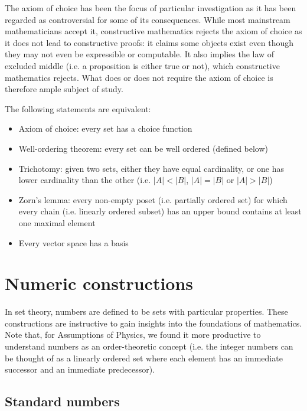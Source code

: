 \documentclass{bareminimum}
\begin{document}
The axiom of choice has been the focus of particular investigation as it has been regarded as controversial for some of its consequences. While most mainstream mathematicians accept it, constructive mathematics rejects the axiom of choice as it does not lead to constructive proofs: it claims some objects exist even though they may not even be expressible or computable. It also implies the law of excluded middle (i.e. a proposition is either true or not), which constructive mathematics rejects. What does or does not require the axiom of choice is therefore ample subject of study.

\begin{prop}
	The following statements are equivalent:
	\begin{itemize}
		\item Axiom of choice: every set has a choice function
		\item Well-ordering theorem: every set can be well ordered (defined below)
		\item Trichotomy: given two sets, either they have equal cardinality, or one has lower cardinality than the other (i.e. $|A| < |B|$, $|A| = |B|$ or $|A| > |B|$)
		\item Zorn's lemma: every non-empty poset (i.e. partially ordered set) for which every chain (i.e. linearly ordered subset) has an upper bound contains at least one maximal element
		\item Every vector space has a basis
	\end{itemize}
\end{prop}

\section{Numeric constructions}
In set theory, numbers are defined to be sets with particular properties. These constructions are instructive to gain insights into the foundations of mathematics. Note that, for Assumptions of Physics, we found it more productive to understand numbers as an order-theoretic concept (i.e. the integer numbers can be thought of as a linearly ordered set where each element has an immediate successor and an immediate predecessor).

\subsection{Standard numbers}
\end{document}
